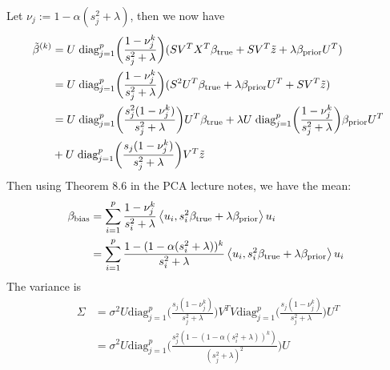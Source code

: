 \documentclass[12pt,twoside]{article}
\begin{document}
\begin{enumerate}
\begin{enumerate}
Let $\nu_j := 1 - \alpha (s_j^2 + \lambda)$, then we now have
\begin{align*}
	\tilde{ \beta }^{(k)} 	&= 	 U \;    \text{diag}_{j=1}^p \bigg(  \frac{ 1 - \nu_j^k} {s_j^2 + \lambda}  \bigg) (S V^T X^T  \beta_{\operatorname{true}}  + S V^T  \tilde{ z } +  \lambda \beta_{\operatorname{prior}}  U^T)\\
					&=	 U \;    \text{diag}_{j=1}^p \bigg(  \frac{ 1 - \nu_j^k} {s_j^2 + \lambda}  \bigg) (S^2 U^T  \beta_{\operatorname{true}}  +  \lambda \beta_{\operatorname{prior}}  U^T  + S V^T  \tilde{ z }) \\	
					&=	 U \;    \text{diag}_{j=1}^p \bigg(  \frac{s_j^2  (1 - \nu_j^k)} {s_j^2 + \lambda} \bigg) U^T \beta_{\operatorname{true}}  + \lambda U \;    \text{diag}_{j=1}^p \bigg(  \frac{1 - \nu_j^k} {s_j^2 + \lambda} \bigg) \beta_{\operatorname{prior}} U^T \\
					&+  	 U \;    \text{diag}_{j=1}^p \bigg(  \frac{ s_j  (1 - \nu_j^k)} {s_j^2 + \lambda} \bigg) V^T  \tilde{ z } 
\end{align*}	
 Then using Theorem 8.6 in the PCA lecture notes, we have the mean:
\begin{align*}
	\beta_{\text{bias}} 	&= \sum_{i=1}^p \frac{1 - \nu_j^k}{s_i^2 + \lambda} \left \langle u_i, s_i^2 \beta_{\operatorname{true}}+ \lambda  \beta_{\operatorname{prior}} \right \rangle u_i \\
					&= \sum_{i=1}^p \frac{1 - (1 - \alpha (s_i^2 + \lambda))^k} {s_i^2 + \lambda} \left \langle u_i, s_i^2 \beta_{\operatorname{true}}+ \lambda  \beta_{\operatorname{prior}} \right \rangle u_i \
\end{align*}
The variance is 
\begin{align*}
	\Sigma			&= \sigma^2 U  \text{diag}_{j=1}^p \bigg(  \frac{ s_j  (1 - \nu_j^k)} {s_j^2 + \lambda} \bigg) V^T V  \text{diag}_{j=1}^p \bigg(  \frac{ s_j  (1 - \nu_j^k)} {s_j^2 + \lambda} \bigg) U^T \\
					&= \sigma^2 U  \text{diag}_{j=1}^p \bigg(  \frac{ s_j^2  (1 - (1 - \alpha (s_i^2 + \lambda))^k)} {(s_j^2 + \lambda)^2} \bigg) U
\end{align*}

 
 \end{enumerate}
 

\end{enumerate}
\end{document}
